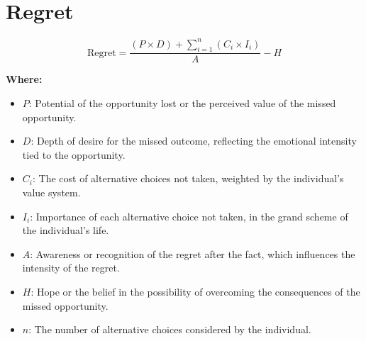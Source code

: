 \chapter{Regret}

\begin{equation}
\text{Regret} = \frac{(P \times D) + \sum_{i=1}^{n} (C_i \times I_i)}{A} - H
\end{equation}

\textbf{Where:}

\begin{itemize}
    \item $P$: Potential of the opportunity lost or the perceived value of the missed opportunity.
    \item $D$: Depth of desire for the missed outcome, reflecting the emotional intensity tied to the opportunity.
    \item $C_i$: The cost of alternative choices not taken, weighted by the individual's value system.
    \item $I_i$: Importance of each alternative choice not taken, in the grand scheme of the individual's life.
    \item $A$: Awareness or recognition of the regret after the fact, which influences the intensity of the regret.
    \item $H$: Hope or the belief in the possibility of overcoming the consequences of the missed opportunity.
    \item $n$: The number of alternative choices considered by the individual.
\end{itemize}
